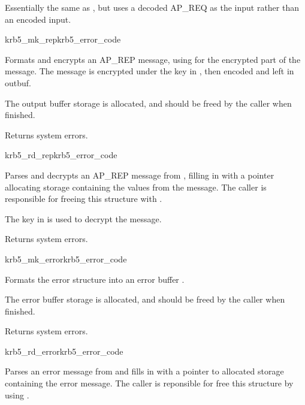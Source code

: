 Essentially the same as , but uses a decoded AP_REQ
as the input rather than an encoded input.

\begin{funcdecl}{krb5_mk_rep}{krb5_error_code}{\funcin}
\funcout
{}
\end{funcdecl}

Formats and encrypts an AP_REP message, using  for the
encrypted part of the message.  The message is encrypted under the key
in , then encoded and left in outbuf.

The output buffer storage is allocated, and should be freed by the
caller when finished.

Returns system errors.

\begin{funcdecl}{krb5_rd_rep}{krb5_error_code}{\funcin}
\funcout
{}
\end{funcdecl}

Parses and decrypts an AP_REP message from , filling in
 with a pointer allocating storage containing the
values from the message.  The caller is responsible for freeing this
structure with .

The key in  is used to decrypt the message.

Returns system errors.

\begin{funcdecl}{krb5_mk_error}{krb5_error_code}{\funcin}
\funcout
{}
\end{funcdecl}

Formats the error structure  into an error buffer
.

The error buffer storage is allocated, and should be freed by the
caller when finished.

Returns system errors.

\begin{funcdecl}{krb5_rd_error}{krb5_error_code}{\funcin}
\funcout
{}
\end{funcdecl}

Parses an error message from  and fills in 
 with a pointer to allocated storage containing
the error message.  The caller is reponsible for free this structure by
using .

